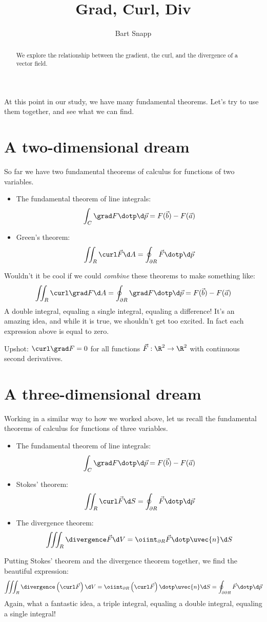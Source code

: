 \documentclass{ximera}
\author{Bart Snapp}
\title[Dig-In:]{Grad, Curl, Div}
\begin{document}
\begin{abstract}
  We explore the relationship between the gradient, the curl, and the
  divergence of a vector field.
\end{abstract}
\maketitle

At this point in our study, we have many fundamental theorems. Let's
try to use them together, and see what we can find.

\section{A two-dimensional dream}

So far we have two fundamental theorems of calculus for functions of
two variables.
\begin{itemize}
\item The fundamental theorem of line integrals:
  \[
  \int_C \grad F \dotp\d\vec{p} = F(\vec{b}) -F(\vec{a})
  \]
\item Green's theorem:
  \[
  \iint_R \curl \vec{F} \d A = \oint_{\partial R} \vec{F} \dotp \d \vec{p}
  \]
\end{itemize}
Wouldn't it be cool if we could \textit{combine} these theorems to
make something like:
\[
\iint_R \curl \grad F \d A = \oint_{\partial R} \grad F \dotp \d \vec{p} = F(\vec{b}) - F(\vec{a})
\]
A double integral, equaling a single integral, equaling a difference!
It's an amazing idea, and while it is true, we shouldn't get too
excited. In fact each expression above is equal to zero.

Upshot: $\curl\grad F = 0$ for all functions $\vec{F}:\R^2\to\R^2$
with continuous second derivatives.


\section{A three-dimensional dream}

Working in a similar way to how we worked above, let us recall the fundamental theorems of calculus for functions of three variables.

\begin{itemize}
\item The fundamental theorem of line integrals:
  \[
  \int_C \grad F \dotp\d\vec{p} = F(\vec{b}) - F(\vec{a}) 
  \]
\item Stokes' theorem:
  \[
  \iint_R \curl\vec{F} \d S = \oint_{\partial R} \vec{F} \dotp \d \vec{p}
  \]
\item The divergence theorem:
  \[
  \iiint_R \divergence\vec{F} \d V = \oiint_{\partial R} \vec{F}\dotp\uvec{n} \d S
  \]
\end{itemize}
Putting Stokes' theorem and the divergence theorem together, we find the beautiful expression:
\[
\iiint_R \divergence\left(\curl\vec{F}\right)\d V = \oiint_{\partial R} \left(\curl \vec{F}\right)\dotp \uvec{n} \d S = \oint_{\partial\partial R} \vec{F}\dotp \d \vec{p}
\]
Again, what a fantastic idea, a triple integral, equaling a double
integral, equaling a single integral!
\end{document}
